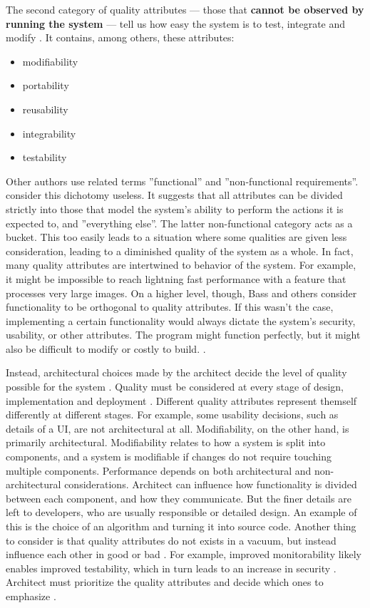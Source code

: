 \documentclass[utf8,english]{gradu3}
\begin{document}
The second category of quality attributes --- those that \textbf{cannot be
  observed by running the system} --- tell us how easy the system is to test,
integrate and modify \parencite[81]{Bass1998}. It contains, among others, these
attributes:
\begin{itemize}
  \item modifiability
  \item portability
  \item reusability
  \item integrability
  \item testability
\end{itemize}

Other authors use related terms ''functional'' and ''non-functional
requirements''. \textcite[76]{Bass1998} consider this dichotomy useless. It
suggests that all attributes can be divided strictly into those that model the
system's ability to perform the actions it is expected to, and ''everything
else''. The latter non-functional category acts as a bucket. This too easily
leads to a situation where some qualities are given less consideration, leading
to a diminished quality of the system as a whole. In fact, many quality
attributes are intertwined to behavior of the system. For example, it might be
impossible to reach lightning fast performance with a feature that processes
very large images. On a higher level, though, Bass and others consider
functionality to be orthogonal to quality attributes. If this wasn't the case,
implementing a certain functionality would always dictate the system's security,
usability, or other attributes. The program might function perfectly, but it
might also be difficult to modify or costly to build. \parencite[77]{Bass1998}.

Instead, architectural choices made by the architect decide the level of quality
possible for the system \parencite[72]{Bass2003}. Quality must be considered at
every stage of design, implementation and deployment \parencite{Bass1998}.
Different quality attributes represent themself differently at different stages.
For example, some usability decisions, such as details of a UI, are not
architectural at all. Modifiability, on the other hand, is primarily
architectural. Modifiability relates to how a system is split into components,
and a system is modifiable if changes do not require touching multiple
components. Performance depends on both architectural and non-architectural
considerations. Architect can influence how functionality is divided between
each component, and how they communicate. But the finer details are left to
developers, who are usually responsible or detailed design. An example of this
is the choice of an algorithm and turning it into source code. Another thing to
consider is that quality attributes do not exists in a vacuum, but instead
influence each other in good or bad \parencite[78]{Bass1998}. For example,
improved monitorability likely enables improved testability, which in turn leads
to an increase in security \parencite[18]{Li2021}. Architect must prioritize the
quality attributes and decide which ones to emphasize \parencite[129]{Bass1998}.
\end{document}
